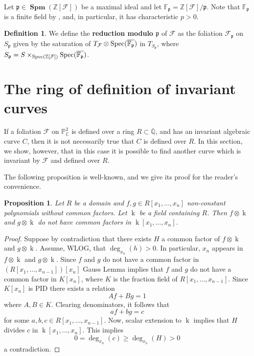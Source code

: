 \documentclass[reqno,oneside,11pt]{amsart}
\newtheorem{prop}[thm]{Proposition}
\theoremstyle{definition}
\newtheorem{dfn}[thm]{Definition}
\DeclareMathOperator{\field}{k}
\DeclareMathOperator{\spm}{\textbf{Spm}}
\begin{document}
Let $\mathfrak{p}\in \spm(\mathbb{Z}[\mathcal{F}])$ be a maximal ideal and let $\mathbb{F}_{\mathfrak{p}} = \mathbb{Z}[\mathcal{F}]/\mathfrak{p}$.  Note that $\mathbb{F}_{\mathfrak{p}}$ is a finite field by \cite[Tag00GB]{stacks-project}, and, in particular, it has characteristic $p>0$.

\begin{dfn} 
    We define the \textbf{reduction modulo $\mathfrak{p}$} of $\mathcal{F}$ as the foliation $\mathcal{F}_{\mathfrak{p}}$ on $S_\mathfrak{p}$ given by the saturation of $T_{\mathcal{F}} \otimes {\rm Spec}(\overline{\mathbb{F}_{\mathfrak{p}}})$ in $T_{S_\mathfrak{p}}$, where $S_\mathfrak{p} = S \times_{{\rm Spec}(\mathbb{Z}[\mathcal{F}])} {\rm Spec}(\overline{\mathbb{F}_{\mathfrak{p}}})$.
\end{dfn}

\section{The ring of definition of invariant curves}\label{ring}

If a foliation $\mathcal{F}$ on $\mathbb{P}^2_{\mathbb{C}}$ is defined over a ring $R \subset \overline{\mathbb{Q}}$, and has an invariant algebraic curve $C$, then it is not necessarily true that $C$ is defined over $R$. In this section, we show, however, that in this case it is possible to find another curve which is invariant by $\mathcal{F}$ and defined over $R$. 

The following proposition is well-known, and we give its proof for the reader's convenience.

\begin{prop}\label{ext} 
    Let $R$ be a domain and $f, g \in R[x_1,\ldots,x_n]$ non-constant polynomials without common factors. Let $\field$ be a field containing $R$. Then $f\otimes \field$ and $g\otimes \field$ do not have common factors in $\field[x_1,\ldots,x_n]$. 
\end{prop}
\begin{proof} 
    Suppose by contradiction that there exists $H$ a common factor of $f\otimes \field$ and $g\otimes \field$. Assume, WLOG, that $\deg_{x_{n}}(h)>0$. In particular, $x_n$ appears in $f\otimes \field$ and $g\otimes \field$. Since $f$ and $g$ do not have a common factor in $(R[x_1,\ldots,x_{n-1}])[x_n]$ Gauss Lemma implies that $f$ and $g$ do not have a common factor in $K[x_n]$, where $K$ is the fraction field of $R[x_1,\ldots,x_{n-1}]$. Since $K[x_n]$ is PID there exists a relation
    $$
        Af+Bg = 1
    $$
    where $A,B \in K$. Clearing denominators, it follows that 
    $$
        af+bg = c
    $$
    for some $a,b,c \in R[x_1,\ldots,x_{n-1}]$. Now, scalar extension to $\field$ implies that $H$ divides $c$ in $\field[x_1,\ldots,x_n]$. This implies
    $$
        0 = \deg_{x_{n}}(c)\geq \deg_{x_n}(H)>0
    $$
    a contradiction.
\end{proof}
\end{document}
